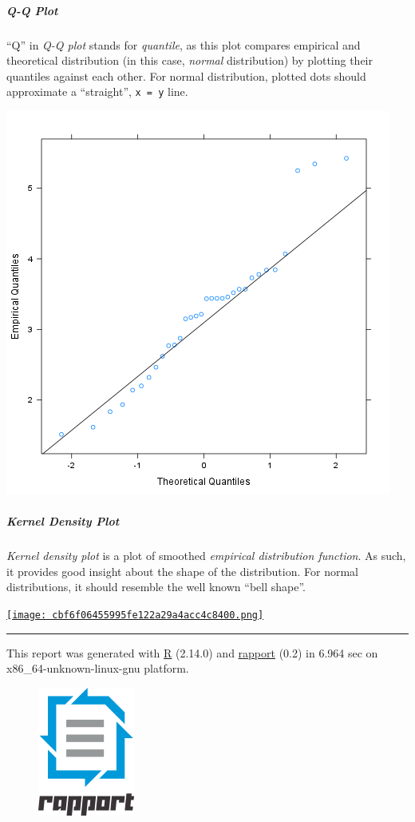 \documentclass[]{article}
\makeatletter
\def\maxwidth{\ifdim\Gin@nat@width>\linewidth\linewidth
\else\Gin@nat@width\fi}
\let\Oldincludegraphics\includegraphics
\renewcommand{\includegraphics}[1]{\Oldincludegraphics[width=\maxwidth]{#1}}
\makeatother
\begin{document}
\subparagraph{Q-Q Plot}

``Q'' in \emph{Q-Q plot} stands for \emph{quantile}, as this plot
compares empirical and theoretical distribution (in this case,
\emph{normal} distribution) by plotting their quantiles against each
other. For normal distribution, plotted dots should approximate a
``straight'', \texttt{x = y} line.

\href{975387b3193e28fb08a85f37cb17f87e-hires.png}{\includegraphics{975387b3193e28fb08a85f37cb17f87e.png}}

\subparagraph{Kernel Density Plot}

\emph{Kernel density plot} is a plot of smoothed \emph{empirical
distribution function}. As such, it provides good insight about the
shape of the distribution. For normal distributions, it should resemble
the well known ``bell shape''.

\href{cbf6f06455995fe122a29a4acc4c8400-hires.png}{\texttt{[image: cbf6f06455995fe122a29a4acc4c8400.png]}}

\begin{center}\rule{3in}{0.4pt}\end{center}

This report was generated with \href{http://www.r-project.org/}{R}
(2.14.0) and \href{http://al3xa.github.com/rapport/}{rapport} (0.2) in
6.964 sec on x86\_64-unknown-linux-gnu platform.

\begin{figure}[htbp]
\centering
\includegraphics{images/logo.png}
\caption{}
\end{figure}
\end{document}
